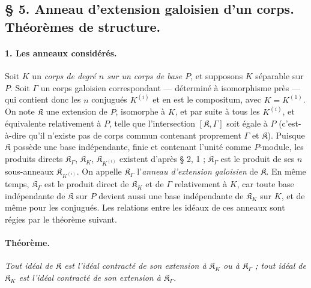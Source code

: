 \subsection*{\S{} 5. Anneau d'extension galoisien d'un corps. Théorèmes de structure.}

\paragraph{1. Les anneaux considérés.}
Soit $K$ un \emph{corps de degré $n$ sur un corps de base $P$}, et supposons $K$ séparable sur $P$. Soit $\Gamma$ un corps galoisien correspondant --- déterminé à isomorphisme près --- qui contient donc les $n$ conjugués $K^{(i)}$ et en est le compositum, avec $K=K^{(1)}$. On note $\mathfrak K$ une extension de $P$, isomorphe à $K$, et par suite à tous les $K^{(i)}$, et équivalente relativement à $P$, telle que l'intersection $[\mathfrak K,\Gamma]$ soit égale à $P$ (c'est-à-dire qu'il n'existe pas de corps commun contenant proprement $\Gamma$ et $\mathfrak K$). Puisque $\mathfrak K$ possède une base indépendante, finie et contenant l'unité comme $P$-module, les produits directs $\mathfrak K_\Gamma$, $\mathfrak K_K$, $\mathfrak K_{K^{(i)}}$ existent d'après \S{} 2, 1 ; $\mathfrak K_\Gamma$ est le produit de ses $n$ sous-anneaux $\mathfrak K_{K^{(i)}}$. On appelle $\mathfrak K_\Gamma$ l'\emph{anneau d'extension galoisien} de $\mathfrak K$. En même temps, $\mathfrak K_\Gamma$ est le produit direct de $\mathfrak K_K$ et de $\Gamma$ relativement à $K$, car toute base indépendante de $\mathfrak K$ sur $P$ devient aussi une base indépendante de $\mathfrak K_K$ sur $K$, et de même pour les conjugués. Les relations entre les idéaux de ces anneaux sont régies par le théorème suivant.

\paragraph{Théorème.}
\emph{Tout idéal de $\mathfrak K$ est l'idéal contracté de son extension à $\mathfrak K_K$ ou à $\mathfrak K_\Gamma$ ; tout idéal de $\mathfrak K_K$ est l'idéal contracté de son extension à $\mathfrak K_\Gamma$.}

